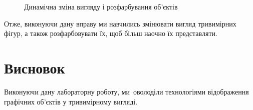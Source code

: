 \documentclass[
	a4paper,
	oneside,
	BCOR = 10mm,
	DIV = 12,
	12pt,
	headings = normal,
]{scrartcl}
\newlength{\gridunitwidth}
\begin{document}
\begin{figure}[!htbp]
\begin{subfigure}[b]{6 \gridunitwidth - (1em / 2)}
					\caption{}
					\label{subfig:06-dynamic-rotation-02}
				\end{subfigure}
				\caption{Динамічна зміна вигляду і розфарбування об'єктів}
				\label{fig:06-dynamic-rotation}
			\end{figure}

		Отже, виконуючи дану вправу ми навчились змінювати вигляд тривимірних фігур, а також розфарбовувати їх, щоб більш наочно їх представляти.

	\section{Висновок}
		Виконуючи дану лабораторну роботу, ми~оволоділи технологіями відображення графічних об'єктів у тривимірному вигляді.
\end{document}
